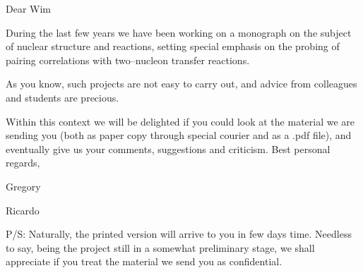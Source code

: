 \documentclass[a4paper,12pt]{book}
\begin{document}
%
Dear Wim


During the last few years we have been working on a monograph on the subject of nuclear structure and reactions, setting special emphasis on the probing of pairing correlations with two--nucleon transfer reactions.

As you know, such projects are not easy to carry out, and advice from colleagues and students are precious.

Within this context we will be delighted if you could look at the material we are sending you (both as paper copy through special courier and as a .pdf file), and eventually give us your comments, suggestions and criticism.
Best personal regards,
\begin{flushleft}
Gregory
	\end{flushleft}
	\vspace{-1.37cm}
\begin{flushright}
 Ricardo
	\end{flushright}
	P/S: Naturally, the printed version will arrive to you in few days time. Needless to say, being the project still in a somewhat preliminary stage, we shall appreciate if you treat the material we send you as confidential.
\end{document}
